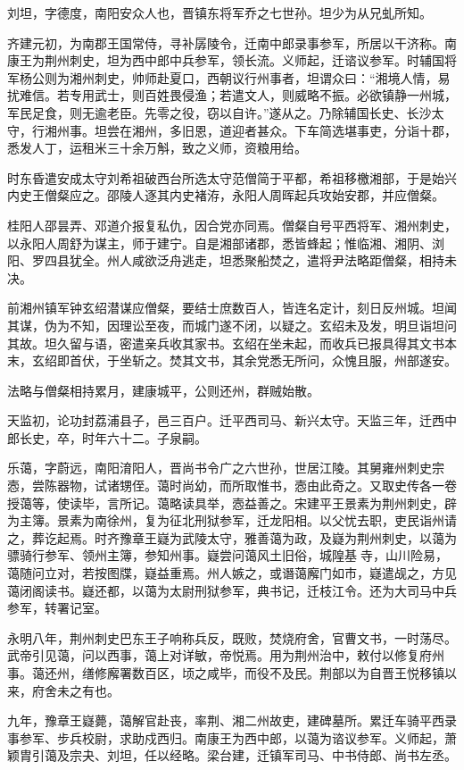 \documentclass[12pt,UTF8]{ctexbook}
\begin{document}
刘坦，字德度，南阳安众人也，晋镇东将军乔之七世孙。坦少为从兄虬所知。

齐建元初，为南郡王国常侍，寻补孱陵令，迁南中郎录事参军，所居以干济称。南康王为荆州刺史，坦为西中郎中兵参军，领长流。义师起，迁谘议参军。时辅国将军杨公则为湘州刺史，帅师赴夏口，西朝议行州事者，坦谓众曰：“湘境人情，易扰难信。若专用武士，则百姓畏侵渔；若遣文人，则威略不振。必欲镇静一州城，军民足食，则无逾老臣。先零之役，窃以自许。”遂从之。乃除辅国长史、长沙太守，行湘州事。坦尝在湘州，多旧恩，道迎者甚众。下车简选堪事吏，分诣十郡，悉发人丁，运租米三十余万斛，致之义师，资粮用给。

时东昏遣安成太守刘希祖破西台所选太守范僧简于平都，希祖移檄湘部，于是始兴内史王僧粲应之。邵陵人逐其内史褚洊，永阳人周晖起兵攻始安郡，并应僧粲。

桂阳人邵昙弄、邓道介报复私仇，因合党亦同焉。僧粲自号平西将军、湘州刺史，以永阳人周舒为谋主，师于建宁。自是湘部诸郡，悉皆蜂起；惟临湘、湘阴、浏阳、罗四县犹全。州人咸欲泛舟逃走，坦悉聚船焚之，遣将尹法略距僧粲，相持未决。

前湘州镇军钟玄绍潜谋应僧粲，要结士庶数百人，皆连名定计，刻日反州城。坦闻其谋，伪为不知，因理讼至夜，而城门遂不闭，以疑之。玄绍未及发，明旦诣坦问其故。坦久留与语，密遣亲兵收其家书。玄绍在坐未起，而收兵已报具得其文书本末，玄绍即首伏，于坐斩之。焚其文书，其余党悉无所问，众愧且服，州部遂安。

法略与僧粲相持累月，建康城平，公则还州，群贼始散。

天监初，论功封荔浦县子，邑三百户。迁平西司马、新兴太守。天监三年，迁西中郎长史，卒，时年六十二。子泉嗣。

乐蔼，字蔚远，南阳淯阳人，晋尚书令广之六世孙，世居江陵。其舅雍州刺史宗悫，尝陈器物，试诸甥侄。蔼时尚幼，而所取惟书，悫由此奇之。又取史传各一卷授蔼等，使读毕，言所记。蔼略读具举，悫益善之。宋建平王景素为荆州刺史，辟为主簿。景素为南徐州，复为征北刑狱参军，迁龙阳相。以父忧去职，吏民诣州请之，葬讫起焉。时齐豫章王嶷为武陵太守，雅善蔼为政，及嶷为荆州刺史，以蔼为骠骑行参军、领州主簿，参知州事。嶷尝问蔼风土旧俗，城隍基寺，山川险易，蔼随问立对，若按图牒，嶷益重焉。州人嫉之，或谮蔼廨门如市，嶷遣觇之，方见蔼闭阁读书。嶷还都，以蔼为太尉刑狱参军，典书记，迁枝江令。还为大司马中兵参军，转署记室。

永明八年，荆州刺史巴东王子响称兵反，既败，焚烧府舍，官曹文书，一时荡尽。武帝引见蔼，问以西事，蔼上对详敏，帝悦焉。用为荆州治中，敕付以修复府州事。蔼还州，缮修廨署数百区，顷之咸毕，而役不及民。荆部以为自晋王悦移镇以来，府舍未之有也。

九年，豫章王嶷薨，蔼解官赴丧，率荆、湘二州故吏，建碑墓所。累迁车骑平西录事参军、步兵校尉，求助戍西归。南康王为西中郎，以蔼为谘议参军。义师起，萧颖胄引蔼及宗夬、刘坦，任以经略。梁台建，迁镇军司马、中书侍郎、尚书左丞。
\end{document}
